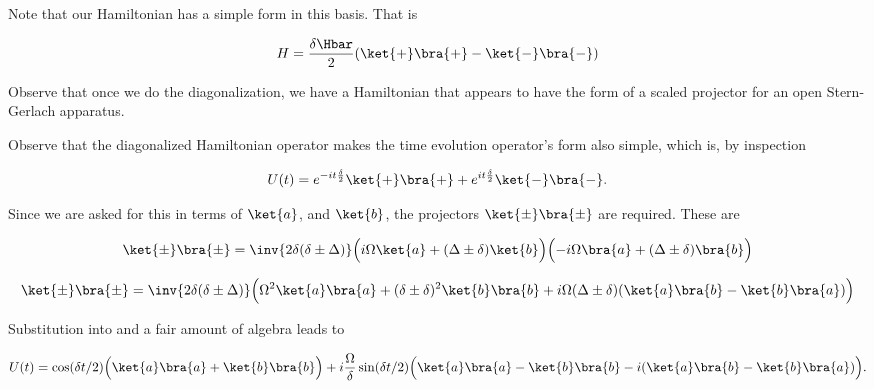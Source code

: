 {Note that our Hamiltonian has a simple form in this basis.  That is

\begin{equation}\label{eqn:qmIexamPractice2008Dec:2:70}
H = \frac{\delta \Hbar}{2} (\ket{+}\bra{+} - \ket{-}\bra{-} )
\end{equation}

Observe that once we do the diagonalization, we have a Hamiltonian that appears to have the form of a scaled projector for an open Stern-Gerlach apparatus.

Observe that the diagonalized Hamiltonian operator makes the time evolution operator's form also simple, which is, by inspection

\begin{equation}\label{eqn:qmIexamPractice2008Dec:2:80}
U(t) = 
e^{-i t \frac{\delta}{2}} \ket{+}\bra{+} 
+ e^{i t \frac{\delta}{2}} \ket{-}\bra{-}.
\end{equation}

Since we are asked for this in terms of \(\ket{a}\), and \(\ket{b}\), the projectors \(\ket{\pm}\bra{\pm}\) are required.  These are

\begin{equation}\label{eqn:qmIexamPractice2008Dec:690}
\begin{aligned}
\ket{\pm}\bra{\pm} 
&= \inv{2 \delta (\delta \pm \Delta)}
\Bigl( i \Omega \ket{a} + (\Delta \pm \delta) \ket{b} \Bigr)
\Bigl( -i \Omega \bra{a} + (\Delta \pm \delta) \bra{b} \Bigr) \\
\end{aligned}
\end{equation}

\begin{equation}\label{eqn:qmIexamPractice2008Dec:2:90}
\ket{\pm}\bra{\pm} 
= \inv{2 \delta (\delta \pm \Delta)}
\Bigl(
\Omega^2 \ket{a}\bra{a}
+(\delta \pm \delta)^2 \ket{b}\bra{b}
+i \Omega (\Delta \pm \delta) (
\ket{a}\bra{b}
-\ket{b}\bra{a}
)
\Bigr)
\end{equation}

Substitution into  and a fair amount of algebra leads to

\begin{equation}\label{eqn:qmIexamPractice2008Dec:2:100}
U(t) = 
\cos(\delta t/2) \Bigl( \ket{a}\bra{a} + \ket{b}\bra{b} \Bigr)
+ i \frac{\Omega}{\delta} \sin(\delta t/2) \Bigl( 
\ket{a}\bra{a} - \ket{b}\bra{b} 
-i (\ket{a}\bra{b} - \ket{b}\bra{a} )
\Bigr).
\end{equation}

}
